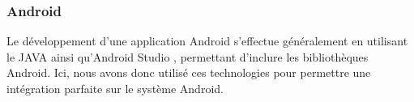 \subsubsection{Android}

Le développement d'une application Android s'effectue généralement en utilisant le JAVA ainsi qu'Android Studio \cite{androidstudio}, permettant d'inclure les bibliothèques Android.
Ici, nous avons donc utilisé ces technologies pour permettre une intégration parfaite sur le système Android.